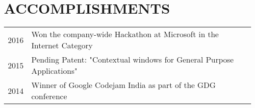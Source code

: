 \documentclass[]{resume-openfont}
\begin{document}
\begin{minipage}[t]{0.74\textwidth}

\section{ACCOMPLISHMENTS} 
\begin{tabular}{rll}
2016	     & Won the company-wide Hackathon at Microsoft in the Internet Category \\
2015 		& Pending Patent: "Contextual windows for General Purpose Applications"\\
2014	     & Winner of Google Codejam India as part of the GDG conference  \\
\end{tabular}
\sectionsep

\end{minipage} 
\end{document}
